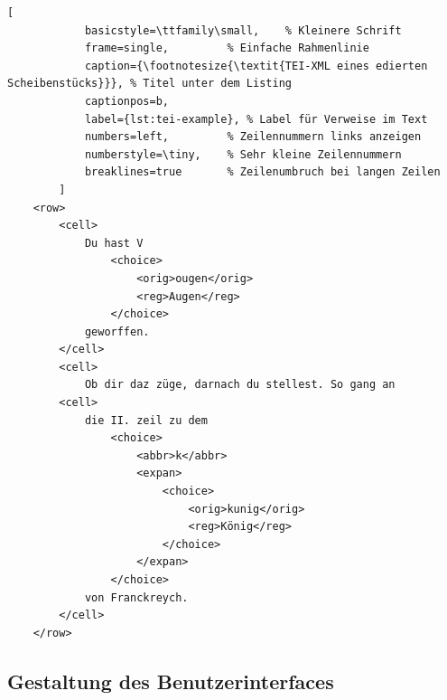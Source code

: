 \documentclass[12pt,a4paper]{article}
\begin{document}
	\begin{lstlisting}[
			basicstyle=\ttfamily\small,    % Kleinere Schrift
			frame=single,         % Einfache Rahmenlinie
			caption={\footnotesize{\textit{TEI-XML eines edierten Scheibenstücks}}}, % Titel unter dem Listing
			captionpos=b,
			label={lst:tei-example}, % Label für Verweise im Text
			numbers=left,         % Zeilennummern links anzeigen
			numberstyle=\tiny,    % Sehr kleine Zeilennummern
			breaklines=true       % Zeilenumbruch bei langen Zeilen
		]
	<row>
		<cell>
			Du hast V 
				<choice>
					<orig>ougen</orig>
					<reg>Augen</reg>
				</choice>
			geworffen.
		</cell>
		<cell>
			Ob dir daz züge, darnach du stellest. So gang an
		<cell>
			die II. zeil zu dem
				<choice>
					<abbr>k</abbr>
					<expan>
						<choice>
							<orig>kunig</orig>
							<reg>König</reg>
						</choice>
					</expan>
				</choice>
			von Franckreych.
		</cell>
	</row>
	\end{lstlisting}
	
	\subsection{Gestaltung des Benutzerinterfaces}
\end{document}
